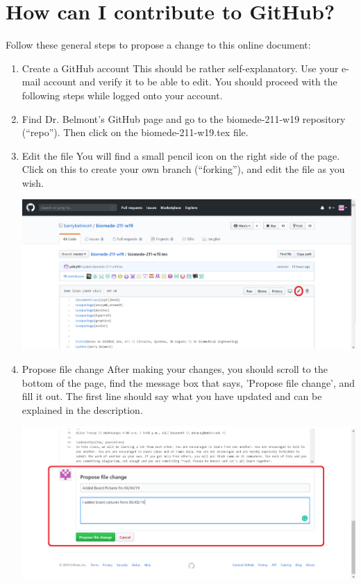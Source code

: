 \documentclass[11pt]{book}
\begin{document}
\section{How can I contribute to GitHub?}
Follow these general steps to propose a change to this online document:
\begin{enumerate}
\item Create a GitHub account
\subitem This should be rather self-explanatory. Use your e-mail account and verify it to be able to edit. You should proceed with the following steps while logged onto your account.
\item Find Dr. Belmont's GitHub page and go to the biomede-211-w19 repository (``repo''). Then click on the biomede-211-w19.tex file.
\item Edit the file
\subitem You will find a small pencil icon on the right side of the page. Click on this to create your own branch (``forking''), and edit the file as you wish.

\includegraphics[width=\textwidth]{figures/GitHub_Tutorial_1.png}

\item Propose file change
\subitem After making your changes, you should scroll to the bottom of the page, find the message box that says, 'Propose file change', and fill it out. The first line should say what you have updated and can be explained in the description.

\includegraphics[width=\textwidth]{figures/GitHub_Tutorial_2.png}


\end{enumerate}
\end{document}
